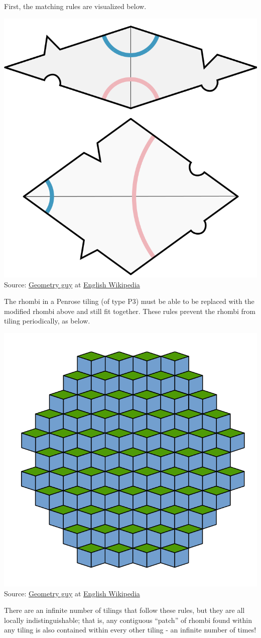 \documentclass{article}
\begin{document}
First, the matching rules are visualized below.
\begin{center}
  \includegraphics[width=0.25\linewidth]{matching.png}\\
  Source: \href{https://en.wikipedia.org/wiki/User:Geometry_guy}{Geometry guy}
  at \href{https://en.wikipedia.org/wiki/}{English Wikipedia}
\end{center}
The rhombi in a Penrose tiling (of type P3)
must be able to be replaced with the modified rhombi above and still fit together.
These rules prevent the rhombi from tiling periodically, as below.
\begin{center}
  \includegraphics[width=0.25\linewidth]{periodic.png}\\
  Source: \href{https://en.wikipedia.org/wiki/User:Geometry_guy}{Geometry guy}
  at \href{https://en.wikipedia.org/wiki/}{English Wikipedia}
\end{center}

There are an infinite number of tilings that follow these rules,
but they are all locally indistinguishable;
that is, any contiguous ``patch'' of rhombi
found within any tiling
is also contained within every other tiling -
an infinite number of times!
\end{document}
